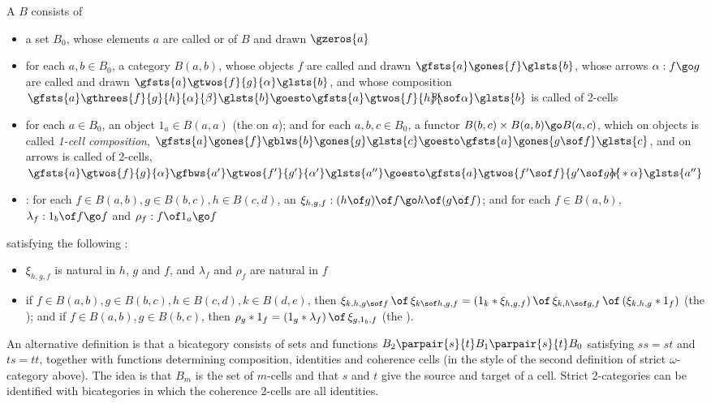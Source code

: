 A  $B$ consists of
%
\begin{itemize}
\item a set $B_0$, whose elements $a$ are called  or
 of $B$ and drawn
$\gzeros{a}$
\item for each $a,b \in B_0$, a category $B(a,b)$, whose objects $f$ are
called  and drawn $\gfsts{a} \gones{f} \glsts{b}$, whose
arrows $\alpha: f \go g$ are called  and drawn $\gfsts{a}
\gtwos{f}{g}{\alpha} \glsts{b}$, and whose composition $\gfsts{a}
\gthrees{f}{g}{h}{\alpha}{\beta} \glsts{b} \goesto \gfsts{a}
\gtwos{f}{h}{\!\!\!\!\!\! \beta \sof \alpha} \glsts{b}$ is called
 of 2-cells
\item for each $a \in B_0$, an object $1_a \in B(a,a)$ (the 
on $a$); and for each $a,b,c \in B_0$, a functor $B(b,c) \times B(a,b) \go
B(a,c)$, which on objects is called \emph{1-cell composition},
$\gfsts{a}\gones{f}\gblws{b}\gones{g}\glsts{c} \goesto 
\gfsts{a}\gones{g\sof f}\glsts{c}$, and on arrows is called  of 2-cells, $\gfsts{a} \gtwos{f}{g}{\alpha} \gfbws{a'}
\gtwos{f'}{g'}{\alpha'} \glsts{a''} \goesto \gfsts{a} \gtwos{f' \sof f}{g' \sof
g}{\!\!\!\!\!\! \alpha' * \alpha} \glsts{a''}$ 
\item {}: for each $f \in B(a,b), g \in B(b,c), h \in
B(c,d)$, an  $\xi_{h,g,f}: (h\of g)\of f
\go h\of (g\of f)$; and for each $f \in B(a,b)$, 
$\lambda_f: 1_b \of f \go f$ and $\rho_f: f \of 1_a \go f$
\end{itemize}
%
satisfying the following :
%
\begin{itemize}
\item $\xi_{h,g,f}$ is natural in $h$, $g$ and $f$, and $\lambda_f$ and
$\rho_f$ are natural in $f$
\item if $f \in B(a,b), g \in B(b,c), h \in B(c,d), k
\in B(d,e)$, then 
$
\xi_{k,h,g\sof f} \,\of\, \xi_{k\sof h, g, f} = 
(1_k * \xi_{h,g,f}) \,\of\, \xi_{k,h\sof g,f} \,\of\, (\xi_{k,h,g} * 1_f)
$
(the );
and if $f \in B(a,b), g \in B(b,c)$, then 
$
\rho_g * 1_f =
(1_g * \lambda_f) \,\of\, \xi_{g,1_b,f}
$
(the ).
\end{itemize}

An alternative definition is that a bicategory consists of sets and functions
$B_2 \parpair{s}{t} B_1 \parpair{s}{t} B_0$ satisfying $ss=st$ and $ts=tt$,
together with functions determining composition, identities and coherence
cells (in the style of the second definition of strict $\omega$-category
above).  The idea is that $B_m$ is the set of $m$-cells and that $s$ and $t$
give the source and target of a cell.  Strict 2-categories can be identified
with bicategories in which the coherence 2-cells are all identities.

